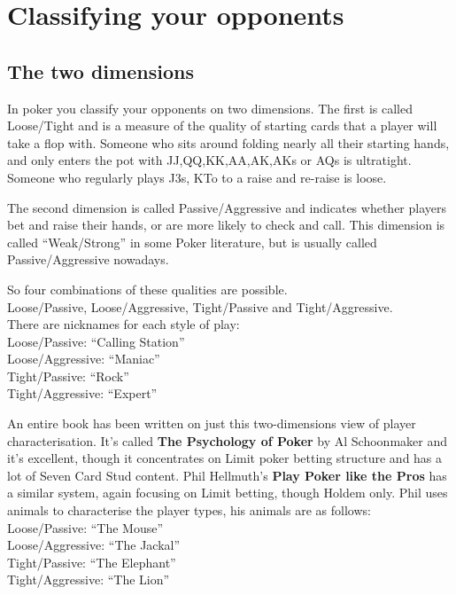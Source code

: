 \chapter{Classifying your opponents}


\section{The two dimensions}

In poker you classify your opponents on two dimensions.
The first is called Loose/Tight and is a measure of the quality
of starting cards that a player will take a flop with. Someone
who sits around folding nearly all their starting hands, and
only enters the pot with JJ,QQ,KK,AA,AK,AKs or AQs is ultratight.
Someone who regularly plays J3s, KTo to a raise and re-raise is loose.

The second dimension is called Passive/Aggressive and indicates
whether players bet and raise their hands, or are more likely
to check and call. This dimension is called ``Weak/Strong'' in some
Poker literature, but is usually called Passive/Aggressive nowadays.

So four combinations of these qualities are possible. \\ 
Loose/Passive, Loose/Aggressive, Tight/Passive and Tight/Aggressive. \\
There are nicknames for each style of play: \\
Loose/Passive: ``Calling Station'' \\
Loose/Aggressive: ``Maniac'' \\
Tight/Passive: ``Rock'' \\
Tight/Aggressive: ``Expert'' 

An entire book has been written on just this two-dimensions view
of player characterisation. It's called \textbf{The Psychology of Poker}
by Al Schoonmaker and it's excellent, though it concentrates
on Limit poker betting structure and has a lot of Seven Card Stud
content. Phil Hellmuth's \textbf{Play Poker like the Pros} has a
similar system, again focusing on Limit betting, though Holdem only.
Phil uses animals to characterise the player types, his animals are
as follows: \\
Loose/Passive: ``The Mouse'' \\
Loose/Aggressive: ``The Jackal'' \\
Tight/Passive: ``The Elephant'' \\
Tight/Aggressive: ``The Lion'' 

